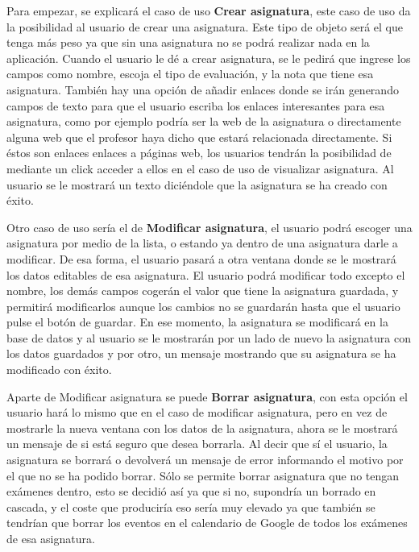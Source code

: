 Para empezar, se explicará el caso de uso \textbf{Crear asignatura}, este caso de uso da la posibilidad al usuario de crear una asignatura. Este tipo de objeto será el que tenga más peso ya que sin una asignatura no se podrá realizar nada en la aplicación.
Cuando el usuario le dé a crear asignatura, se le pedirá que ingrese los campos como nombre, escoja el tipo de evaluación, y la nota que tiene esa asignatura.
También hay una opción de añadir enlaces donde se irán generando campos de texto para que el usuario escriba los enlaces interesantes para esa asignatura, como por ejemplo podría ser la web de la asignatura o directamente alguna web que el profesor haya dicho que estará relacionada directamente. Si éstos son enlaces  enlaces a páginas web, los usuarios tendrán la posibilidad de mediante un click acceder a ellos en el caso de uso de visualizar asignatura.
Al usuario se le mostrará un texto diciéndole que la asignatura se ha creado con éxito.

Otro caso de uso sería el de \textbf{Modificar asignatura}, el usuario podrá escoger una asignatura por medio de la lista, o estando ya dentro de una asignatura darle a modificar. De esa forma, el usuario pasará a otra ventana donde se le mostrará los datos editables de esa asignatura.
El usuario podrá modificar todo excepto el nombre, los demás campos cogerán el valor que tiene la asignatura guardada, y permitirá modificarlos aunque los  cambios no se guardarán hasta que el usuario pulse el botón de guardar.
En ese momento, la asignatura se modificará en la base de datos y al usuario se le mostrarán por un lado de nuevo la asignatura con los datos guardados y por otro, un mensaje mostrando que su asignatura se ha modificado con éxito.


Aparte de Modificar asignatura se puede \textbf{Borrar asignatura}, con esta opción el usuario hará lo mismo que en el caso de modificar asignatura, pero en vez de mostrarle la nueva ventana con los datos de la asignatura, ahora se le mostrará un mensaje de si está seguro que desea borrarla.
Al decir que sí el usuario, la asignatura se borrará o devolverá un mensaje de error informando el motivo por el que no se ha podido borrar.
Sólo se permite borrar asignatura que no tengan exámenes dentro, esto se decidió así ya que si no, supondría un borrado en cascada, y el coste que produciría eso sería muy elevado ya que también se tendrían que borrar los eventos en el calendario de Google de todos los exámenes de esa asignatura.



